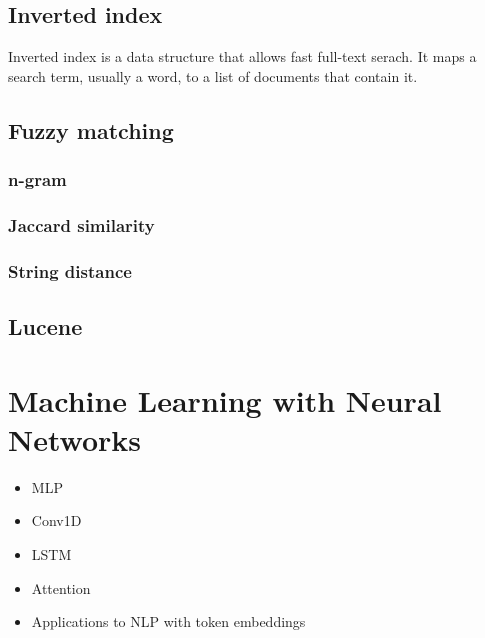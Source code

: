 
\subsection{Inverted index}
Inverted index is a data structure that allows fast full-text serach. It maps a search term, usually a word, to a list of documents that contain it. 




\subsection{Fuzzy matching}
\subsubsection{n-gram}
\subsubsection{Jaccard similarity}
\subsubsection{String distance} %

\subsection{Lucene}

\section{Machine Learning with Neural Networks}
\label{background:ml_nn}

{\color{red}
\begin{itemize}
    \item MLP
    \item Conv1D
    \item LSTM
    \item Attention
    \item Applications to NLP with token embeddings
\end{itemize}
}
